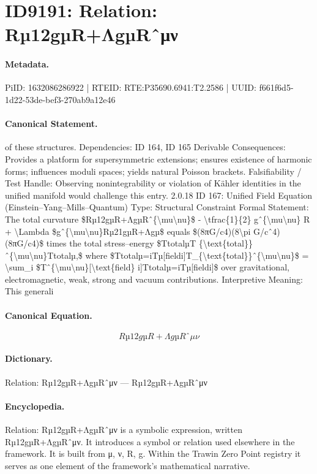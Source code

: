 \section*{ID9191: Relation: Rµ12gµR+ΛgµRˆμν}
\paragraph{Metadata.}
PiID: 1632086286922 | RTEID: RTE:P35690.6941:T2.2586 | UUID: f661f6d5-1d22-53de-bef3-270ab9a12e46

\paragraph{Canonical Statement.}
of these structures. Dependencies: ID 164, ID 165 Derivable Consequences: Provides a platform for supersymmetric extensions; ensures existence of harmonic forms; influences moduli spaces; yields natural Poisson brackets. Falsifiability / Test Handle: Observing nonintegrability or violation of Kähler identities in the unified manifold would challenge this entry. 2.0.18 ID 167: Unified Field Equation (Einstein–Yang–Mills–Quantum) Type: Structural Constraint Formal Statement: The total curvature \$Rµ12gµR+ΛgµRˆ\{\textbackslash{}mu\textbackslash{}nu\}\$ - \textbackslash{}tfrac\{1\}\{2\} gˆ\{\textbackslash{}mu\textbackslash{}nu\} R + \textbackslash{}Lambda \$gˆ\{\textbackslash{}mu\textbackslash{}nu\}Rµ21gµR+Λgµ\$ equals \$(8πG/c4)(8\textbackslash{}pi G/cˆ4)(8πG/c4)\$ times the total stress–energy \$TtotalµT \{\textbackslash{}text\{total\}\}ˆ\{\textbackslash{}mu\textbackslash{}nu\}Ttotalµ,\$ where \$Ttotalµ=iTµ[fieldi]T\_\{\textbackslash{}text\{total\}\}ˆ\{\textbackslash{}mu\textbackslash{}nu\}\$ = \textbackslash{}sum\_i \$Tˆ\{\textbackslash{}mu\textbackslash{}nu\}[\textbackslash{}text\{field\} i]Ttotalµ=iTµ[fieldi]\$ over gravitational, electromagnetic, weak, strong and vacuum contributions. Interpretive Meaning: This generali

\paragraph{Canonical Equation.}
\[
Rµ12gµR+ΛgµRˆ{\mu\nu}
\]

\paragraph{Dictionary.}
Relation: Rµ12gµR+ΛgµRˆμν — Rµ12gµR+ΛgµRˆμν

\paragraph{Encyclopedia.}
Relation: Rµ12gµR+ΛgµRˆμν is a symbolic expression, written Rµ12gµR+ΛgµRˆμν. It introduces a symbol or relation used elsewhere in the framework. It is built from μ, ν, R, g. Within the Trawin Zero Point registry it serves as one element of the framework's mathematical narrative.
